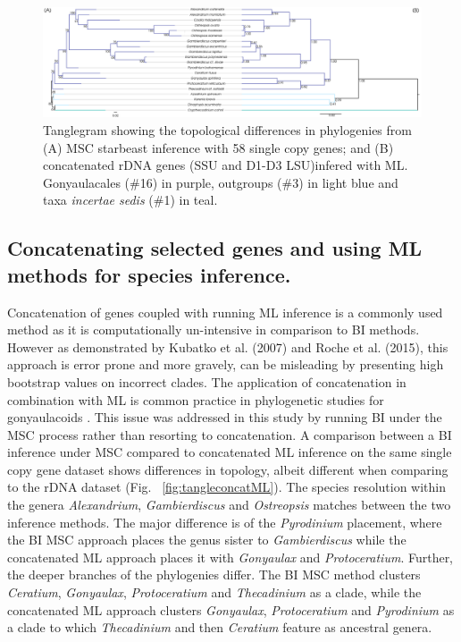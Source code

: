 \documentclass[12pt]{article}
\begin{document}
\begin{figure} 
\includegraphics[scale=.2]{figures/MSC-BI_vs_rDNA-ML.png} 
\caption{Tanglegram showing the topological differences in phylogenies from (A) MSC starbeast inference with 58 single copy genes; and (B) concatenated rDNA genes (SSU and D1-D3 LSU)infered with ML. Gonyaulacales (\#16) in purple, outgroups (\#3) in light blue and taxa \textit{incertae sedis} (\#1) in teal.} 
\label{fig:tanglerDNA}
\end{figure} 
\FloatBarrier

\subsection*{Concatenating selected genes and using ML methods for species inference.}
\FloatBarrier
Concatenation of genes coupled with running ML inference is a commonly used method as it is computationally un-intensive in comparison to BI methods. 
However as demonstrated by Kubatko et al. (2007) and Roche et al. (2015), this approach is error prone and more gravely, can be misleading by presenting high bootstrap values on incorrect clades. 
The application of concatenation in combination with ML is common practice in phylogenetic studies for gonyaulacoids  \cite{shalchian2006combined,zhang2007three,saldarriaga2004molecular,murray2005improving,hoppenrath2010dinoflagellate}.
This issue was addressed in this study by running BI under the MSC process rather than resorting to concatenation. 
A comparison between a BI inference under MSC compared to concatenated ML inference on the same single copy gene dataset shows differences in topology, albeit different when comparing to the rDNA dataset (Fig. ~\ref{fig:tangleconcatML}). 
The species resolution within the genera \emph{Alexandrium}, \emph{Gambierdiscus} and \emph{Ostreopsis} matches between the two inference methods. 
The major difference is of the \emph{Pyrodinium} placement, where the BI MSC approach places the genus sister to \emph{Gambierdiscus} while the concatenated ML approach places it with \emph{Gonyaulax} and \emph{Protoceratium}. 
Further, the deeper branches of the phylogenies differ. 
The BI MSC method clusters \emph{Ceratium}, \emph{Gonyaulax}, \emph{Protoceratium} and \emph{Thecadinium} as a clade, while the concatenated ML approach clusters \emph{Gonyaulax}, \emph{Protoceratium} and \emph{Pyrodinium} as a clade to which \emph{Thecadinium} and then \emph{Ceratium} feature as ancestral genera. 
\end{document}

